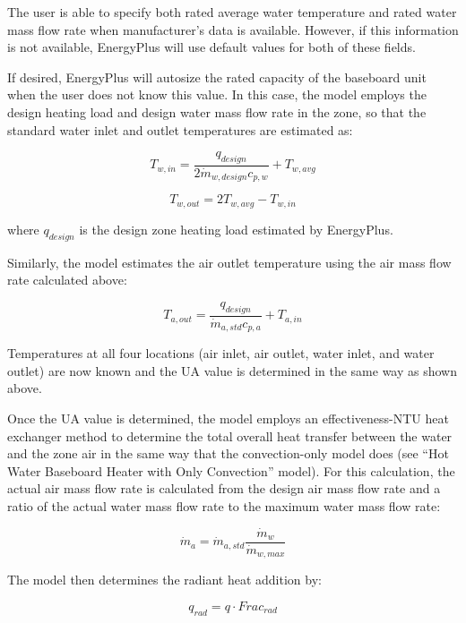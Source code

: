 The user is able to specify both rated average water temperature and rated water mass flow rate when manufacturer's data is available. However, if this information is not available, EnergyPlus will use default values for both of these fields.

If desired, EnergyPlus will autosize the rated capacity of the baseboard unit when the user does not know this value. In this case, the model employs the design heating load and design water mass flow rate in the zone, so that the standard water inlet and outlet temperatures are estimated as:

\begin{equation}
{T_{w,in}} = \frac{{{q_{design}}}}{{2\dot m{}_{w,design}{c_{p,w}}}} + {T_{w,avg}}
\end{equation}

\begin{equation}
{T_{w,out}} = 2{T_{w,avg}} - {T_{w,in}}
\end{equation}

where \({q_{design}}\) is the design zone heating load estimated by EnergyPlus.

Similarly, the model estimates the air outlet temperature using the air mass flow rate calculated above:

\begin{equation}
{T_{a,out}} = \frac{{{q_{design}}}}{{\dot m_{a,std} {c_{p,a}}}} + {T_{a,in}}
\end{equation}

Temperatures at all four locations (air inlet, air outlet, water inlet, and water outlet) are now known and the UA value is determined in the same way as shown above.

Once the UA value is determined, the model employs an effectiveness-NTU heat exchanger method to determine the total overall heat transfer between the water and the zone air in the same way that the convection-only model does (see ``Hot Water Baseboard Heater with Only Convection'' model). For this calculation, the actual air mass flow rate is calculated from the design air mass flow rate and a ratio of the actual water mass flow rate to the maximum water mass flow rate:

\begin{equation}
\dot{m}_a = \dot{m}_{a,std} \frac{\dot{m}_w}{\dot{m}_{w,max}}
\end{equation}

The model then determines the radiant heat addition by:

\begin{equation}
q_{rad} = q \cdot Frac_{rad}
\end{equation}

